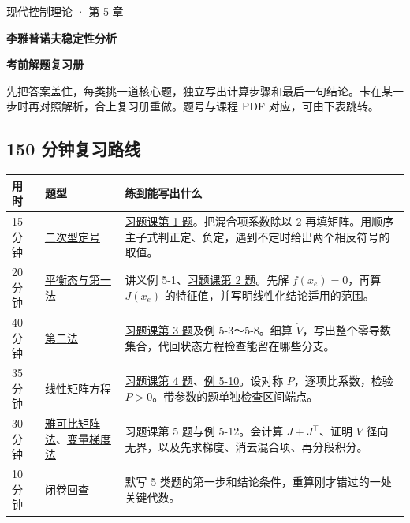 \documentclass[UTF8,a4paper,11pt,fontset=fandol]{ctexart}
\begin{document}
\color{ink}
\setlength{\abovedisplayskip}{7pt plus 2pt minus 1pt}
\setlength{\belowdisplayskip}{7pt plus 2pt minus 1pt}
\setlength{\abovedisplayshortskip}{5pt plus 1pt}
\setlength{\belowdisplayshortskip}{5pt plus 1pt}
\thispagestyle{opening}

{\large\color{teal}现代控制理论 · 第 5 章\par}
\vspace{5pt}
{\fontsize{27}{34}\selectfont\bfseries 李雅普诺夫稳定性分析\par}
\vspace{4pt}
{\large\bfseries 考前解题复习册\par}

先把答案盖住，每类挑一道核心题，独立写出计算步骤和最后一句结论。卡在某一步时再对照解析，合上复习册重做。题号与课程 PDF 对应，可由下表跳转。

\subsection*{150 分钟复习路线}
\begingroup
\setlength{\extrarowheight}{6pt}
\begin{tabularx}{\linewidth}{@{}l>{\raggedright\arraybackslash}p{36mm}>{\raggedright\arraybackslash}X@{}}
\toprule
\textbf{用时} & \textbf{题型} & \textbf{练到能写出什么} \\
\midrule
15 分钟 & \hyperref[sec:quadratic]{二次型定号} &
\hyperref[prob:exercise1]{习题课第 1 题}。把混合项系数除以 $2$ 再填矩阵。用顺序主子式判正定、负定，遇到不定时给出两个相反符号的取值。\\
20 分钟 & \hyperref[sec:first]{平衡态与第一法} &
讲义例 5-1、\hyperref[prob:exercise2]{习题课第 2 题}。先解 $f(x_e)=0$，再算 $J(x_e)$ 的特征值，并写明线性化结论适用的范围。\\
40 分钟 & \hyperref[sec:direct]{第二法} &
\hyperref[prob:exercise3]{习题课第 3 题}及例 5-3～5-8。细算 $\dot V$，写出整个零导数集合，代回状态方程检查能留在哪些分支。\\
35 分钟 & \hyperref[sec:linear]{线性矩阵方程} &
\hyperref[prob:exercise4]{习题课第 4 题}、\hyperref[prob:gain]{例 5-10}。设对称 $P$，逐项比系数，检验 $P>0$。带参数的题单独检查区间端点。\\
30 分钟 & \hyperref[sec:jacobian]{雅可比矩阵法}、\hyperref[sec:gradient]{变量梯度法} &
习题课第 5 题与例 5-12。会计算 $J+J^\top$、证明 $V$ 径向无界，以及先求梯度、消去混合项、再分段积分。\\
10 分钟 & \hyperref[sec:final]{闭卷回查} &
默写 5 类题的第一步和结论条件，重算刚才错过的一处关键代数。\\
\bottomrule
\end{tabularx}
\endgroup
\end{document}
